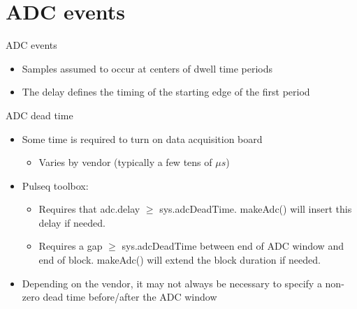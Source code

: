 \documentclass{beamer}
\begin{document}
\section{ADC events}
\begin{frame}{ADC events}

\begin{itemize}
    \item Samples assumed to occur at centers of dwell time periods 
    \item The delay defines the timing of the starting edge of the first period
\end{itemize}




\end{frame}



\begin{frame}{ADC dead time}

\begin{itemize}
    \item Some time is required to turn on data acquisition board
    \begin{itemize}
        \item Varies by vendor (typically a few tens of $\mu s$)
    \end{itemize}
    \item Pulseq toolbox:
    \begin{itemize}
        \item Requires that adc.delay $\geq$ sys.adcDeadTime.  makeAdc() will insert this delay if needed.
        \item Requires a gap $\geq$ sys.adcDeadTime between end of ADC window and end of block. makeAdc() will extend the block duration if needed.
    \end{itemize}
    \item Depending on the vendor, it may not always be necessary to specify a non-zero dead time before/after the ADC window 
\end{itemize}

\end{frame}



\end{document}
